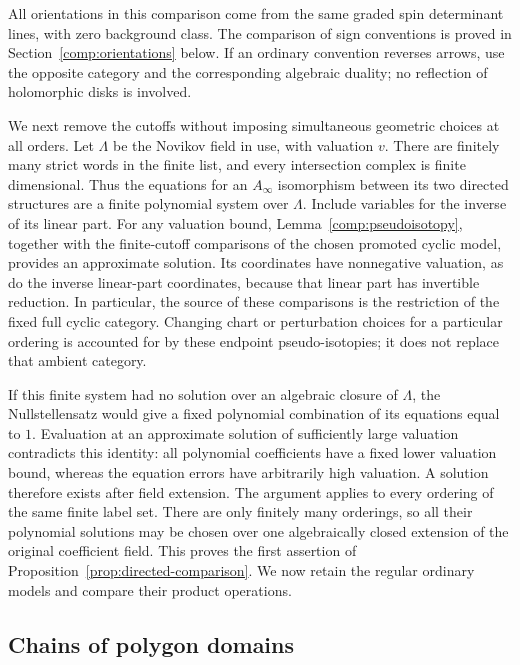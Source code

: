All orientations in this comparison come from the same graded spin
determinant lines, with zero background class.  The comparison of
sign conventions is proved in Section~\ref{comp:orientations} below.
If an ordinary convention reverses arrows, use the opposite
category and the corresponding algebraic duality; no reflection of
holomorphic disks is involved.

We next remove the cutoffs without imposing simultaneous geometric
choices at all orders.  Let $\Lambda$ be the Novikov field in use,
with valuation $v$.  There are finitely many strict words in the
finite list, and every intersection complex is finite dimensional.
Thus the equations for an $A_\infty$ isomorphism between its two
directed structures are a finite polynomial system over $\Lambda$.
Include variables for the inverse of its linear part.  For any
valuation bound, Lemma~\ref{comp:pseudoisotopy}, together with the
finite-cutoff comparisons of the chosen promoted cyclic model, provides an
approximate solution.  Its coordinates have nonnegative valuation,
as do the inverse linear-part coordinates, because that linear
part has invertible reduction.  In particular, the source of
these comparisons is the restriction of the fixed full cyclic category.
Changing chart or perturbation choices for a particular ordering is
accounted for by these endpoint pseudo-isotopies; it does not replace
that ambient category.

If this finite system had no solution over an algebraic closure of
$\Lambda$, the Nullstellensatz would give a fixed polynomial
combination of its equations equal to $1$.  Evaluation at an
approximate solution of sufficiently large valuation contradicts
this identity: all polynomial coefficients have a fixed lower
valuation bound, whereas the equation errors have arbitrarily high
valuation.  A solution therefore exists after field extension.
The argument applies to every ordering of the same finite label set.
There are only finitely many orderings, so all their polynomial
solutions may be chosen over one algebraically closed extension of
the original coefficient field.  This proves the first assertion of
Proposition~\ref{prop:directed-comparison}.  We now retain the
regular ordinary models and compare their product operations.

\subsection{Chains of polygon domains}
\label{comp:domain-chains}

